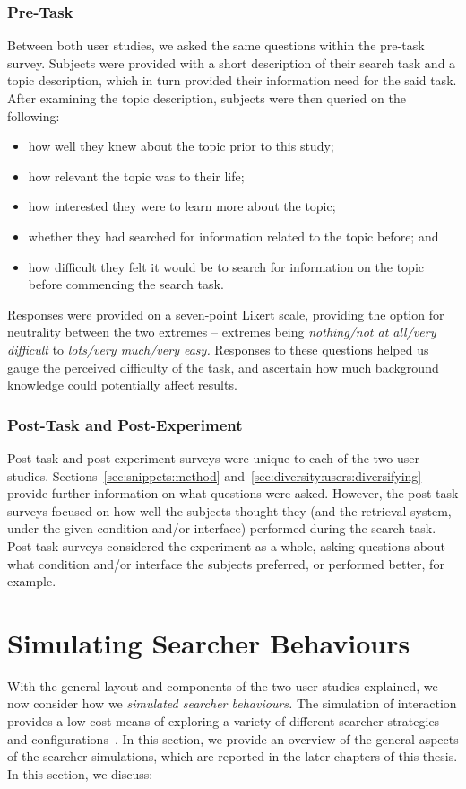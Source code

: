 \subsubsection{Pre-Task}
Between both user studies, we asked the same questions within the pre-task survey. Subjects were provided with a short description of their search task and a topic description, which in turn provided their information need for the said task. After examining the topic description, subjects were then queried on the following:

\begin{itemize}
    \item{how well they knew about the topic prior to this study;}
    \item{how relevant the topic was to their life;}
    \item{how interested they were to learn more about the topic;}
    \item{whether they had searched for information related to the topic before; and}
    \item{how difficult they felt it would be to search for information on the topic before commencing the search task.}
\end{itemize}

Responses were provided on a seven-point Likert scale, providing the option for neutrality between the two extremes -- extremes being \emph{nothing/not at all/very difficult} to \emph{lots/very much/very easy.} Responses to these questions helped us gauge the perceived difficulty of the task, and ascertain how much background knowledge could potentially affect results.

\subsubsection{Post-Task and Post-Experiment}
Post-task and post-experiment surveys were unique to each of the two user studies. Sections~\ref{sec:snippets:method} and~\ref{sec:diversity:users:diversifying} provide further information on what questions were asked. However, the post-task surveys focused on how well the subjects thought they (and the retrieval system, under the given condition and/or interface) performed during the search task. Post-task surveys considered the experiment as a whole, asking questions about what condition and/or interface the subjects preferred, or performed better, for example.

\section{Simulating Searcher Behaviours}\label{sec:method:simulation}
With the general layout and components of the two user studies explained, we now consider how we \emph{simulated searcher behaviours.} The simulation of interaction provides a low-cost means of exploring a variety of different searcher strategies and configurations~\citep{azzopardi2010workshop}. In this section, we provide an overview of the general aspects of the  searcher simulations, which are reported in the later chapters of this thesis. In this section, we discuss:

